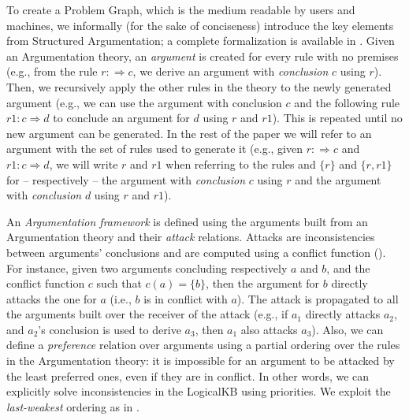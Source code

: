 \documentclass[5p,times]{elsarticle}
\begin{document}

To create a Problem Graph, which is the medium readable by users and machines, we informally (for the sake of conciseness) introduce the key elements from Structured Argumentation; a complete formalization is available in \cite{Modgil2014aspic+}.
Given an Argumentation theory, an \emph{argument} is created for every rule with no premises (e.g., from the rule $r : \Rightarrow c$, we derive an argument with \emph{conclusion} $c$ using $r$).
Then, we recursively apply the other rules in the theory to the newly generated argument (e.g., we can use the argument with conclusion $c$ and the following rule $r1 : c \Rightarrow d$ to conclude an argument for $d$ using $r$ and $r1$).
This is repeated until no new argument can be generated.
In the rest of the paper we will refer to an argument with the set of rules used to generate it (e.g., given $r : \Rightarrow c$ and $r1 : c \Rightarrow d$, we will write $r$ and $r1$ when referring to the rules and $\{r\}$ and $\{r, r1\}$ for -- respectively -- the argument with \emph{conclusion} $c$ using $r$ and the argument with \emph{conclusion} $d$ using $r$ and $r1$).

An \emph{Argumentation framework} is defined using the arguments built from an Argumentation theory and their \emph{attack} relations.
Attacks are inconsistencies between arguments' conclusions and are computed using a conflict function ().
For instance, given two arguments concluding respectively $a$ and $b$, and the conflict function $c$ such that $c(a) = \{b\}$, then the argument for $b$ directly attacks the one for $a$ (i.e., $b$ is in conflict with $a$).
The attack is propagated to all the arguments built over the receiver of the attack (e.g., if $a_1$ directly attacks $a_2$, and $a_2$'s conclusion is used to derive $a_3$, then $a_1$ also attacks $a_3$).
Also, we can define a \emph{preference} relation over arguments using a partial ordering over the rules in the Argumentation theory:
it is impossible for an argument to be attacked by the least preferred ones, even if they are in conflict.
In other words, we can explicitly solve inconsistencies in the LogicalKB using priorities.
We exploit the \emph{last-weakest} ordering as in \cite{Modgil2014aspic+}.
\end{document}
